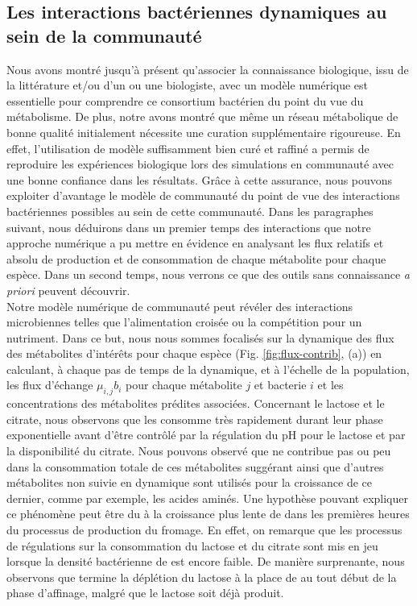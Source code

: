\documentclass[../main.tex]{subfiles}
\begin{document}
\subsection{Les interactions bactériennes dynamiques au sein de la communauté}

Nous avons montré jusqu'à présent qu'associer la connaissance biologique, issu de la littérature et/ou d'un ou une biologiste, avec un modèle numérique est essentielle pour comprendre ce consortium bactérien du point du vue du métabolisme. De plus, notre avons montré que même un réseau métabolique de bonne qualité initialement nécessite une curation supplémentaire rigoureuse. En effet, l'utilisation de modèle suffisamment bien curé et raffiné a permis de reproduire les expériences biologique lors des simulations en communauté avec une bonne confiance dans les résultats. Grâce à cette assurance, nous pouvons exploiter d'avantage le modèle de communauté du point de vue des interactions bactériennes possibles au sein de cette communauté. Dans les paragraphes suivant, nous déduirons dans un premier temps des interactions que notre approche numérique a pu mettre en évidence en analysant les flux relatifs et absolu de production et de consommation de chaque métabolite pour chaque espèce. Dans un second temps, nous verrons ce que des outils sans connaissance \textit{a priori} peuvent découvrir. \\


Notre modèle numérique de communauté peut révéler des interactions microbiennes telles que l'alimentation croisée ou la compétition pour un nutriment. Dans ce but, nous nous sommes focalisés sur la dynamique des flux des métabolites d'intérêts pour chaque espèce (Fig. \ref{fig:flux-contrib}, (a)) en calculant, à chaque pas de temps de la dynamique, et à l'échelle de la population, les flux d'échange $\mu_{i,j} b_i$ pour chaque métabolite $j$ et bacterie $i$ et les concentrations des métabolites prédites associées. Concernant le lactose et le citrate, nous observons que \lactis les consomme très rapidement durant leur phase exponentielle avant d'être contrôlé par la régulation du pH pour le lactose et par la disponibilité du citrate. Nous pouvons observé que \plantarum ne contribue pas ou peu dans la consommation totale de ces métabolites suggérant ainsi que d'autres métabolites non suivie en dynamique sont utilisés pour la croissance de ce dernier, comme par exemple, les acides aminés. Une hypothèse pouvant expliquer ce phénomène peut être du à la croissance plus lente de \plantarum dans les premières heures du processus de production du fromage. En effet, on remarque que les processus de régulations sur la consommation du lactose et du citrate sont mis en jeu lorsque la densité bactérienne de \plantarum est encore faible. De manière surprenante, nous observons que \freud termine la déplétion du lactose à la place de \plantarum au tout début de la phase d'affinage, malgré que le lactose soit déjà produit. 
\end{document}
